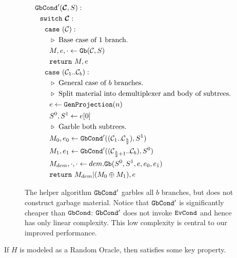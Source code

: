 \begin{figure}
  \begin{align*}
    &\gbcond'(\vec{\cir}, S):\\
    &~~\switch~\vec{\cir}:\\
    &~~~~\ccase~(\cir):\\
    &~~~~~~\codecomment{Base case of $1$ branch.}\\
    &~~~~~~M, e, \cdot \gets \gb(\cir, S)\\
    &~~~~~~\creturn~M, e\\
    &~~~~\ccase~(\cir_1..\cir_b):\\
    &~~~~~~\codecomment{General case of $b$ branches.}\\
    &~~~~~~\codecomment{Split material into demultiplexer and body of subtrees.}\\
    &~~~~~~e \gets \genprojection(n)\\
    &~~~~~~S^0, S^1 \gets e[0]\\
    &~~~~~~\codecomment{Garble both subtrees.}\\
    &~~~~~~M_0,e_0 \gets \gbcond'((\cir_1..\cir_{\frac{b}{2}}), S^1)\\
    &~~~~~~M_1,e_1 \gets \gbcond'((\cir_{\frac{b}{2}+1}..\cir_b), S^0)\\
    &~~~~~~M_{dem},\cdot, \cdot \gets dem.\gb(S^0, S^1, e, e_0, e_1)\\
    &~~~~~~\creturn~M_{dem}|(M_0\oplus M_1), e
  \end{align*}
  \caption{%
    The helper algorithm $\mathtt{GbCond}'$ garbles all $b$ branches, but does
    not construct garbage material.
    Notice that $\mathtt{GbCond}'$ is significantly cheaper than $\mathtt{GbCond}$:
    $\mathtt{GbCond}'$ does not invoke $\mathtt{EvCond}$ and hence has only linear
    complexity.
    This low complexity is central to our improved performance.
  }
\end{figure}






\begin{theorem}\label{thm:key}
  If $H$ is modeled as a Random Oracle, then  satisfies some key property.
\end{theorem}
